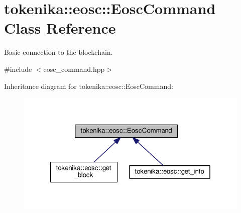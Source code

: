 \hypertarget{classtokenika_1_1eosc_1_1_eosc_command}{}\section{tokenika\+:\+:eosc\+:\+:Eosc\+Command Class Reference}
\label{classtokenika_1_1eosc_1_1_eosc_command}


Basic connection to the blockchain.  




{\ttfamily \#include $<$eosc\+\_\+command.\+hpp$>$}



Inheritance diagram for tokenika\+:\+:eosc\+:\+:Eosc\+Command\+:\nopagebreak
\begin{figure}[H]
\begin{center}
\leavevmode
\includegraphics[width=320pt]{classtokenika_1_1eosc_1_1_eosc_command__inherit__graph}
\end{center}
\end{figure}

